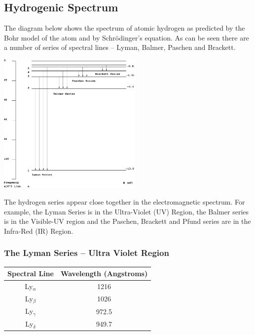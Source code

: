\documentclass[a4paper]{serif}
\begin{document}
    \subsection{Hydrogenic Spectrum}
    The diagram below shows the spectrum of atomic hydrogen as predicted by the
    Bohr model of the atom and by Schr\"odinger's equation. As can be seen there
    are a number of series of spectral lines -- Lyman, Balmer, Paschen and Brackett.
    \begin{center}
        \includegraphics[width=7cm]{spectrum.eps}
    \end{center}
    The hydrogen series appear close together in the electromagnetic spectrum.
    For example, the Lyman Series is in the Ultra-Violet (UV) Region, the Balmer
    series is in the Visible-UV region and the Paschen, Brackett and Pfund series
    are in the Infra-Red (IR) Region.

    \subsubsection{The Lyman Series -- Ultra Violet Region}
    \begin{center}
        \begin{tabular}{cc} \hline
        Spectral Line & Wavelength (Angstroms) \\ \hline \hline
        Ly$_{\alpha}$     &   1216    \\ 
        Ly$_{\beta}$      &   1026    \\ 
        Ly$_{\gamma}$     &   972.5   \\
        Ly$_{\delta}$    &   949.7   \\ \hline
        \end{tabular}
    \end{center}
\end{document}
